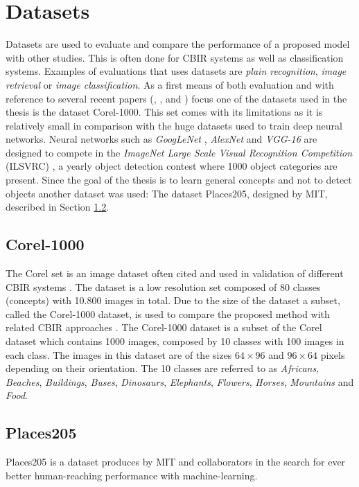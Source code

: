 \section{Datasets}
\label{sec:theory:datasets}
Datasets are used to evaluate and compare the performance of a proposed model with other studies. This is often done for CBIR systems as well as classification systems.
Examples of evaluations that uses datasets are \emph{plain recognition}, \emph{image retrieval} or \emph{image classification}. 
As a first means of both evaluation and with reference to several recent papers (\cite{wang2001simplicity}, \cite{subrahmanyam2013modified}, \cite{nagaraja2015low} and \cite{elalami2014new}) focus one of the datasets used in the thesis is the dataset Corel-1000. 
This set comes with its limitations as it is relatively small in comparison with the huge datasets used to train deep neural networks. Neural networks such as \emph{GoogLeNet} \cite{szegedy2015going}, \emph{AlexNet} \cite{krizhevsky2012imagenet} and \emph{VGG-16} \cite{simonyan2014very} are designed to compete in the \emph{ImageNet Large Scale Visual Recognition Competition} (ILSVRC) \cite{russakovsky2015imagenet}, a yearly object detection contest where 1000 object categories are present. Since the goal of the thesis is to learn general concepts and not to detect objects another dataset was used: The dataset Places205, designed by MIT, described in Section \ref{sec:theory:dataset:places}.   


\subsection{Corel-1000}
\label{sec:corel}
The Corel set is an image dataset often cited and used in validation of different CBIR systems \cite{coreldataset2017}. The dataset is a low resolution set composed of 80 classes (concepts) with 10.800 images in total. Due to the size of the dataset a subset, called the Corel-1000 dataset, is used to compare the proposed method with related CBIR approaches \cite{wang2001simplicity}. The Corel-1000 dataset is a subset of the Corel dataset which contains 1000 images, composed by 10 classes with 100 images in each class. The images in this dataset are of the sizes $64\times96$ and $96\times64$ pixels depending on their orientation. The 10 classes are referred to as \emph{Africans}, \emph{Beaches}, \emph{Buildings}, \emph{Buses}, \emph{Dinosaurs}, \emph{Elephants}, \emph{Flowers}, \emph{Horses}, \emph{Mountains} and \emph{Food}. 

\subsection{Places205}
\label{sec:theory:dataset:places}
Places205 is a dataset produces by MIT and collaborators in the search for ever better human-reaching performance with machine-learning. 

